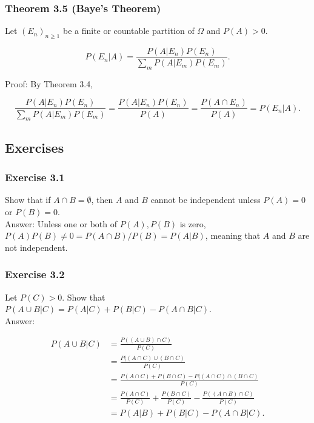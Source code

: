 \documentclass{article}
\begin{document}
{\subsubsection*{Theorem 3.5 (Baye's Theorem)} Let $(E_n)_{n\geq 1}$ be a finite or countable partition of $\Omega$ and $P(A) > 0$.

$$
P(E_n \vert A) = \frac{P(A \vert E_n)P(E_n)}{\sum_m P(A \vert E_m) P(E_m)}.
$$

Proof: By Theorem 3.4,

$$
\frac{P(A \vert E_n)P(E_n)}{\sum_m P(A \vert E_m) P(E_m)}
= \frac{P(A \vert E_n)P(E_n)}{P(A)}
= \frac{P(A \cap E_n)}{P(A)}
= P(E_n \vert A).
$$



\subsection*{Exercises}

\subsubsection*{Exercise 3.1}

Show that if $A \cap B = \emptyset$, then $A$ and $B$ cannot be independent unless $P(A) = 0$ or $P(B) = 0$. \\

Answer: Unless one or both of $P(A), P(B)$ is zero, $P(A)P(B) \neq 0 = P(A\cap B) / P(B) = P(A \vert B)$, meaning that $A$ and $B$ are not independent.

\subsubsection*{Exercise 3.2} Let $P(C) > 0$. Show that $P(A \cup B \vert C) = P(A \vert C) + P(B \vert C) - P(A \cap B \vert C)$. \\

Answer:

\begin{align*}
P(A\cup B \vert C) &= \frac{P((A\cup B) \cap C)}{P(C)} \\
&= \frac{P((A\cap C) \cup (B \cap C)}{P(C)} \\
&= \frac{P(A \cap C) + P(B \cap C) - P((A\cap C) \cap (B \cap C)}{P(C)} \\
&= \frac{P(A\cap C)}{P(C)} + \frac{P(B\cap C)}{P(C)} - \frac{P((A\cap B) \cap C)}{P(C)} \\
&= P(A \vert B) + P(B \vert C) - P(A\cap B \vert C).
\end{align*}

}
\end{document}
